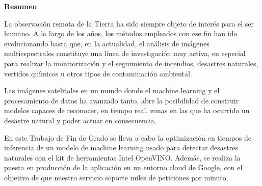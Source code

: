 \cleardoublepage
\begin{center}

{\bf \Huge Resumen}

\end{center}

La observación remota de la Tierra ha sido siempre objeto de interés para el ser humano. A lo largo de los años, los métodos empleados con ese fin han ido evolucionando hasta que, en la actualidad, el análisis de imágenes multiespectrales constituye una línea de investigación muy activa, en especial para realizar la monitorización y el seguimiento de incendios, desastres naturales, vertidos químicos u otros tipos de contaminación ambiental.

Las imágenes satelitales en un mundo donde el machine learning y el procesamiento de datos ha avanzado tanto, abre la posibilidad de construir modelos capaces de reconocer, en tiempo real, zonas en las que ha ocurrido un desastre natural y poder actuar en consecuencia. %

En este Trabajo de Fin de Grado se lleva a cabo la optimización en tiempos de inferencia de un modelo de machine learning usado para detectar desastres naturales con el kit de herramientas Intel OpenVINO. Además, se realiza la puesta en producción de la aplicación en un entorno cloud de Google, con el objetivo de que nuestro servicio soporte miles de peticiones por minuto.



